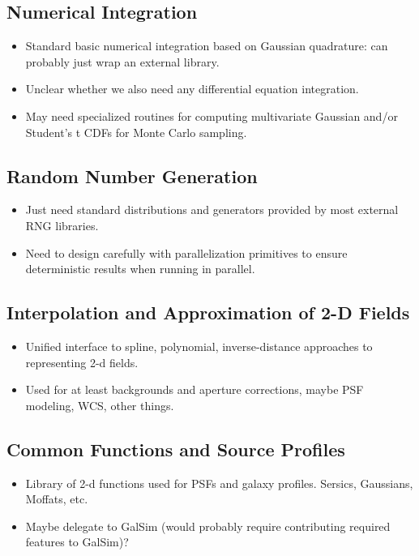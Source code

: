 \subsection{Numerical Integration}
\label{sec:spIntegration}

\begin{itemize}
\item Standard basic numerical integration based on Gaussian quadrature: can probably just wrap an external library.
\item Unclear whether we also need any differential equation integration.
\item May need specialized routines for computing multivariate Gaussian and/or Student's t CDFs for Monte Carlo sampling.
\end{itemize}


\subsection{Random Number Generation}
\label{sec:spRandomNumbers}

\begin{itemize}
\item Just need standard distributions and generators provided by most external RNG libraries.
\item Need to design carefully with parallelization primitives to ensure  deterministic results when running in parallel.
\end{itemize}

\subsection{Interpolation and Approximation of 2-D Fields}
\label{sec:spInterpApprox}

\begin{itemize}
\item Unified interface to spline, polynomial, inverse-distance approaches to representing 2-d fields.
\item Used for at least backgrounds and aperture corrections, maybe PSF modeling, WCS, other things.
\end{itemize}

\subsection{Common Functions and Source Profiles}
\label{sec:spFunctions}

\begin{itemize}
\item Library of 2-d functions used for PSFs and galaxy profiles.  Sersics, Gaussians, Moffats, etc.
\item Maybe delegate to GalSim (would probably require contributing required features to GalSim)?
\end{itemize}

